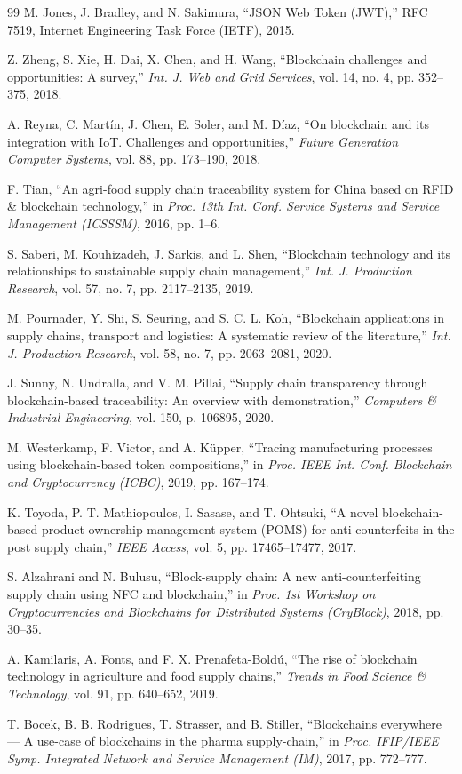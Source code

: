 \documentclass[12pt,a4paper]{report}
\begin{document}
\begin{thebibliography}{99}
 M. Jones, J. Bradley, and N. Sakimura, ``JSON Web Token (JWT),'' RFC 7519, Internet Engineering Task Force (IETF), 2015.

 Z. Zheng, S. Xie, H. Dai, X. Chen, and H. Wang, ``Blockchain challenges and opportunities: A survey,'' \textit{Int. J. Web and Grid Services}, vol. 14, no. 4, pp. 352--375, 2018.

 A. Reyna, C. Martín, J. Chen, E. Soler, and M. Díaz, ``On blockchain and its integration with IoT. Challenges and opportunities,'' \textit{Future Generation Computer Systems}, vol. 88, pp. 173--190, 2018.

 F. Tian, ``An agri-food supply chain traceability system for China based on RFID \& blockchain technology,'' in \textit{Proc. 13th Int. Conf. Service Systems and Service Management (ICSSSM)}, 2016, pp. 1--6.

 S. Saberi, M. Kouhizadeh, J. Sarkis, and L. Shen, ``Blockchain technology and its relationships to sustainable supply chain management,'' \textit{Int. J. Production Research}, vol. 57, no. 7, pp. 2117--2135, 2019.

 M. Pournader, Y. Shi, S. Seuring, and S. C. L. Koh, ``Blockchain applications in supply chains, transport and logistics: A systematic review of the literature,'' \textit{Int. J. Production Research}, vol. 58, no. 7, pp. 2063--2081, 2020.

 J. Sunny, N. Undralla, and V. M. Pillai, ``Supply chain transparency through blockchain-based traceability: An overview with demonstration,'' \textit{Computers \& Industrial Engineering}, vol. 150, p. 106895, 2020.

 M. Westerkamp, F. Victor, and A. Küpper, ``Tracing manufacturing processes using blockchain-based token compositions,'' in \textit{Proc. IEEE Int. Conf. Blockchain and Cryptocurrency (ICBC)}, 2019, pp. 167--174.

 K. Toyoda, P. T. Mathiopoulos, I. Sasase, and T. Ohtsuki, ``A novel blockchain-based product ownership management system (POMS) for anti-counterfeits in the post supply chain,'' \textit{IEEE Access}, vol. 5, pp. 17465--17477, 2017.

 S. Alzahrani and N. Bulusu, ``Block-supply chain: A new anti-counterfeiting supply chain using NFC and blockchain,'' in \textit{Proc. 1st Workshop on Cryptocurrencies and Blockchains for Distributed Systems (CryBlock)}, 2018, pp. 30--35.

 A. Kamilaris, A. Fonts, and F. X. Prenafeta-Boldú, ``The rise of blockchain technology in agriculture and food supply chains,'' \textit{Trends in Food Science \& Technology}, vol. 91, pp. 640--652, 2019.

 T. Bocek, B. B. Rodrigues, T. Strasser, and B. Stiller, ``Blockchains everywhere --- A use-case of blockchains in the pharma supply-chain,'' in \textit{Proc. IFIP/IEEE Symp. Integrated Network and Service Management (IM)}, 2017, pp. 772--777.

\end{thebibliography}
\end{document}
